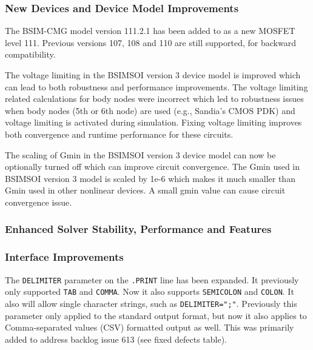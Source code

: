 \documentclass[letterpaper]{scrartcl}
\begin{document}
\subsubsection*{New Devices and Device Model Improvements}
\begin{XyceItemize}

\item The BSIM-CMG model version 111.2.1 has been added to \Xyce{} as a new MOSFET level 111.  Previous versions 107, 108 and 110 are still supported, for backward compatibility.

\item The voltage limiting in the BSIMSOI version 3 device model is
improved which can lead to both robustness and performance improvements.
The voltage limiting related calculations for body nodes were incorrect 
which led to robustness issues when body nodes (5th or 6th node) are
used (e.g., Sandia's CMOS PDK) and voltage limiting is activated during
simulation. Fixing voltage limiting improves both convergence
and runtime performance for these circuits.

\item The scaling of Gmin in the BSIMSOI version 3 device model can now
be optionally turned off which can improve circuit convergence. The Gmin
used in BSIMSOI version 3 model is scaled by 1e-6 which makes it much smaller than
Gmin used in other nonlinear devices. A small gmin value can cause circuit
convergence issue.

\end{XyceItemize}

\subsubsection*{Enhanced Solver Stability, Performance and Features}
\begin{XyceItemize}
\item
\end{XyceItemize}

\subsubsection*{Interface Improvements}
\begin{XyceItemize}
\item The \texttt{DELIMITER} parameter on the \texttt{.PRINT} line has been expanded.  It previously only supported \texttt{TAB} and \texttt{COMMA}.  Now it also supports \texttt{SEMICOLON} and \texttt{COLON}.  It also will allow single character strings, such as \texttt{DELIMITER=";"}.  Previously this parameter only applied to the standard output format, but now it also applies to Comma-separated values (CSV) formatted output as well.  This was primarily added to address backlog issue 613 (see fixed defects table).
\end{XyceItemize}
\end{document}
